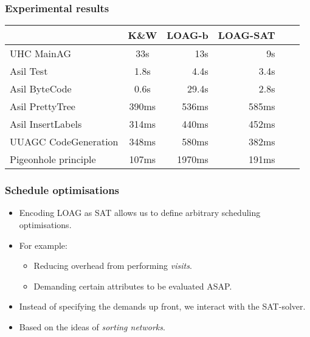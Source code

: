 \documentclass{beamer}
\begin{document}
\begin{frame}
    \frametitle{Experimental results}
    \begin{tabular}{l || c || r || r || r || r}
                 &   K\&W & LOAG-b & LOAG-SAT\\
      \hline
      UHC MainAG          & 33s   & 13s   & 9s    \\
      Asil Test              & 1.8s  & 4.4s  & 3.4s  \\
      Asil ByteCode         & 0.6s  & 29.4s & 2.8s  \\
      Asil PrettyTree         & 390ms & 536ms & 585ms \\
      Asil InsertLabels       & 314ms & 440ms & 452ms \\
      UUAGC CodeGeneration&  348ms & 580ms & 382ms \\
      Pigeonhole principle        & 107ms & 1970ms& 191ms \\ 
    \end{tabular}
\end{frame}

\begin{frame}
\frametitle{Schedule optimisations}
\begin{itemize}
    \item Encoding LOAG as SAT allows us to define arbitrary scheduling optimisations.
    \item For example:
        \begin{itemize}
            \item Reducing overhead from performing \emph{visits}.
            \item Demanding certain attributes to be evaluated ASAP.
        \end{itemize}
    \item Instead of specifying the demands up front, we interact with the SAT-solver.
    \item Based on the ideas of \emph{sorting networks}.
\end{itemize}
\end{frame}
\end{document}

